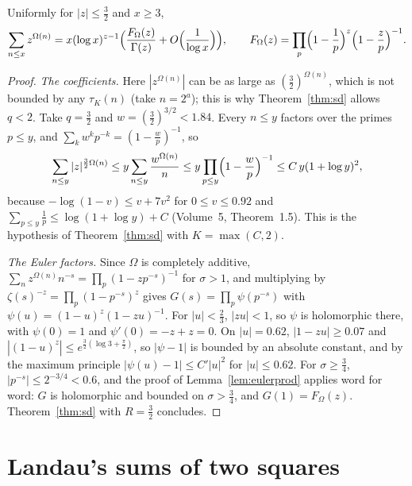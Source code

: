 \begin{corollary}\label{cor:bigomegasd}
Uniformly for $|z|\le\frac32$ and $x\ge3$,
\[
\sum_{n\le x}z^{\Omega(n)}=x(\log x)^{z-1}\Bigl(\frac{F_\Omega(z)}{\Gamma(z)}+O\Bigl(\frac1{\log x}\Bigr)\Bigr),\qquad F_\Omega(z)=\prod_p\Bigl(1-\frac1p\Bigr)^z\Bigl(1-\frac zp\Bigr)^{-1}.
\]
\end{corollary}
\begin{proof}
\emph{The coefficients.} Here $|z^{\Omega(n)}|$ can be as large as $(\frac32)^{\Omega(n)}$, which is not bounded by any $\tau_K(n)$ (take $n=2^a$); this is why Theorem~\ref{thm:sd} allows $q<2$. Take $q=\frac32$ and $w=(\frac32)^{3/2}<1.84$. Every $n\le y$ factors over the primes $p\le y$, and $\sum_kw^kp^{-k}=(1-\frac wp)^{-1}$, so
\[
\sum_{n\le y}|z|^{\frac32\Omega(n)}\le y\sum_{n\le y}\frac{w^{\Omega(n)}}n\le y\prod_{p\le y}\Bigl(1-\frac wp\Bigr)^{-1}\le C\,y(1+\log y)^2,
\]
because $-\log(1-v)\le v+7v^2$ for $0\le v\le0.92$ and $\sum_{p\le y}\frac1p\le\log(1+\log y)+C$ (Volume~5, Theorem~1.5). This is the hypothesis of Theorem~\ref{thm:sd} with $K=\max(C,2)$.

\emph{The Euler factors.} Since $\Omega$ is completely additive, $\sum_nz^{\Omega(n)}n^{-s}=\prod_p(1-zp^{-s})^{-1}$ for $\sigma>1$, and multiplying by $\zeta(s)^{-z}=\prod_p(1-p^{-s})^z$ gives $G(s)=\prod_p\psi(p^{-s})$ with $\psi(u)=(1-u)^z(1-zu)^{-1}$. For $|u|<\frac23$, $|zu|<1$, so $\psi$ is holomorphic there, with $\psi(0)=1$ and $\psi'(0)=-z+z=0$. On $|u|=0.62$, $|1-zu|\ge0.07$ and $|(1-u)^z|\le e^{\frac32(\log3+\frac\pi2)}$, so $|\psi-1|$ is bounded by an absolute constant, and by the maximum principle $|\psi(u)-1|\le C'|u|^2$ for $|u|\le0.62$. For $\sigma\ge\frac34$, $|p^{-s}|\le2^{-3/4}<0.6$, and the proof of Lemma~\ref{lem:eulerprod} applies word for word: $G$ is holomorphic and bounded on $\sigma>\frac34$, and $G(1)=F_\Omega(z)$. Theorem~\ref{thm:sd} with $R=\frac32$ concludes.
\end{proof}

\section{Landau's sums of two squares}

